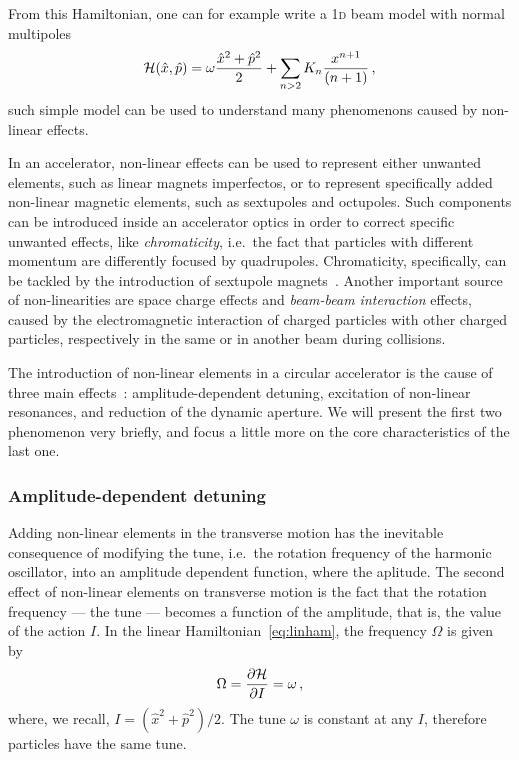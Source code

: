 From this Hamiltonian, one can for example write a 1\textsc{d} beam model with normal multipoles
\begin{equation}
	\mathcal{H}(\hat x,\hat p) = \omega \frac{\hat x^2 + \hat p^2}{2} + \sum_{n>2} K_n \frac{x^{n+1}}{(n+1)}\, ,
	\label{eq:hamxp_nl}
\end{equation}
such simple model can be used to understand many phenomenons caused by non-linear effects.

In an accelerator, non-linear effects can be used to represent either unwanted elements, such as linear magnets imperfectos, or to represent specifically added non-linear magnetic elements, such as sextupoles and octupoles. Such components can be introduced inside an accelerator optics in order to correct specific unwanted effects, like \textit{chromaticity}, i.e.\ the fact that particles with different momentum are differently focused by quadrupoles. Chromaticity, specifically, can be tackled by the introduction of sextupole magnets~\cite{}. Another important source of non-linearities are space charge effects and \textit{beam-beam interaction} effects, caused by the electromagnetic interaction of charged particles with other charged particles, respectively in the same or in another beam during collisions.

The introduction of non-linear elements in a circular accelerator is the cause of three main effects~\cite{herr}: amplitude-dependent detuning, excitation of non-linear resonances, and reduction of the dynamic aperture. We will present the first two phenomenon very briefly, and focus a little more on the core characteristics of the last one.

\subsubsection{Amplitude-dependent detuning}

Adding non-linear elements in the transverse motion has the inevitable consequence of modifying the tune, i.e.\ the rotation frequency of the harmonic oscillator, into an amplitude dependent function, where the aplitude.
The second effect of non-linear elements on transverse motion is the fact that the rotation frequency --- the tune --- becomes a function of the amplitude, that is, the value of the action $I$. In the linear Hamiltonian~\eqref{eq:linham}, the frequency $\Omega$ is given by
\begin{equation}
	\Omega = \pdv{\mathcal{H}}{I} = \omega\,,
\end{equation}
where, we recall, $I=(\hat x^2 + \hat p^2)/2$. The tune $\omega$ is constant at any $I$, therefore particles have the same tune.

